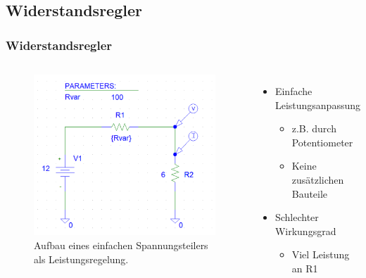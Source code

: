 \documentclass{beamer}
\begin{document}
	\subsection{Widerstandsregler}
	\begin{frame}
		\frametitle{Widerstandsregler}
		\begin{columns}
			\begin{figure}[tbh]
				\centering
				\includegraphics[width=1\linewidth]{medien/V1-0.png}
				\caption[Erster Aufbau]{Aufbau eines einfachen Spannungsteilers als Leistungsregelung.}
				\label{fig:aufbau1}
			\end{figure}
			\begin{itemize}
				\item{Einfache Leistungsanpassung}
				\begin{itemize}
					\item{z.B. durch Potentiometer}
					\item{Keine zusätzlichen Bauteile}
				\end{itemize}
				\item{Schlechter Wirkungsgrad}
				\begin{itemize}
					\item{Viel Leistung an R1}
				\end{itemize}
			\end{itemize}
		\end{columns}
	\end{frame}
\end{document}
